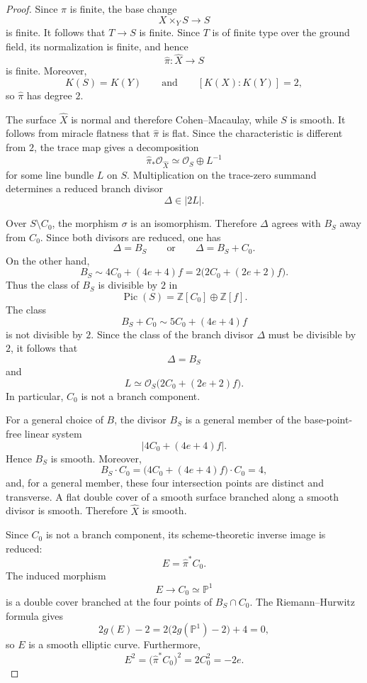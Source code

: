 \documentclass[11pt,twoside]{amsart}
\theoremstyle{plain}
\numberwithin{equation}{section}
\theoremstyle{definition}
\begin{document}
\begin{proof}
Since $\pi$ is finite, the base change
\[
X\times_Y S\longrightarrow S
\]
is finite. It follows that $T\to S$ is finite. Since $T$ is of finite type over the ground field, its normalization is finite, and hence
\[
\widehat\pi:\widehat X\longrightarrow S
\]
is finite. Moreover,
\[
K(S)=K(Y)
\qquad\text{and}\qquad
[K(X):K(Y)]=2,
\]
so $\widehat\pi$ has degree $2$.

The surface $\widehat X$ is normal and therefore Cohen--Macaulay, while $S$ is smooth. It follows from miracle flatness that $\widehat\pi$ is flat. Since the characteristic is different from $2$, the trace map gives a decomposition
\[
\widehat\pi_*\mathcal O_{\widehat X}
\simeq
\mathcal O_S\oplus L^{-1}
\]
for some line bundle $L$ on $S$. Multiplication on the trace-zero summand determines a reduced branch divisor
\[
\Delta\in|2L|.
\]

Over $S\setminus C_0$, the morphism $\sigma$ is an isomorphism. Therefore $\Delta$ agrees with $B_S$ away from $C_0$. Since both divisors are reduced, one has
\[
\Delta=B_S
\qquad\text{or}\qquad
\Delta=B_S+C_0.
\]
On the other hand,
\[
B_S\sim4C_0+(4e+4)f
     =2\bigl(2C_0+(2e+2)f\bigr).
\]
Thus the class of $B_S$ is divisible by $2$ in
\[
\operatorname{Pic}(S)
=
\mathbb Z[C_0]\oplus\mathbb Z[f].
\]
The class
\[
B_S+C_0\sim5C_0+(4e+4)f
\]
is not divisible by $2$. Since the class of the branch divisor $\Delta$ must be divisible by $2$, it follows that
\[
\Delta=B_S
\]
and
\[
L\simeq\mathcal O_S\bigl(2C_0+(2e+2)f\bigr).
\]
In particular, $C_0$ is not a branch component.

For a general choice of $B$, the divisor $B_S$ is a general member of the base-point-free linear system
\[
\left|4C_0+(4e+4)f\right|.
\]
Hence $B_S$ is smooth. Moreover,
\[
B_S\cdot C_0
=
\bigl(4C_0+(4e+4)f\bigr)\cdot C_0
=
4,
\]
and, for a general member, these four intersection points are distinct and transverse. A flat double cover of a smooth surface branched along a smooth divisor is smooth. Therefore $\widehat X$ is smooth.

Since $C_0$ is not a branch component, its scheme-theoretic inverse image is reduced:
\[
E=\widehat\pi^*C_0.
\]
The induced morphism
\[
E\longrightarrow C_0\simeq\mathbb P^1
\]
is a double cover branched at the four points of $B_S\cap C_0$. The Riemann--Hurwitz formula gives
\[
2g(E)-2
=
2\bigl(2g(\mathbb P^1)-2\bigr)+4
=
0,
\]
so $E$ is a smooth elliptic curve. Furthermore,
\[
E^2
=
\bigl(\widehat\pi^*C_0\bigr)^2
=
2C_0^2
=
-2e.
\]


\end{proof}
\end{document}
